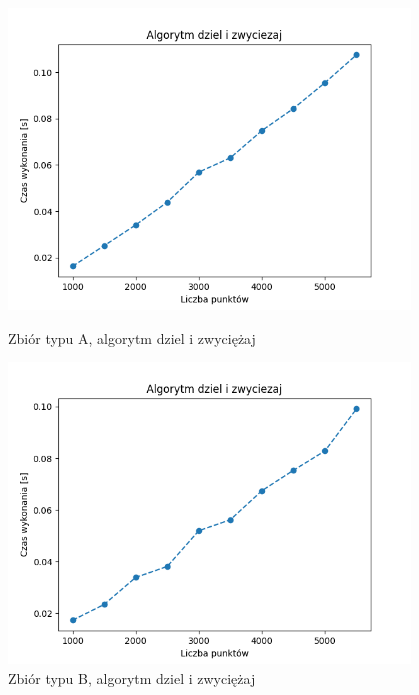 \documentclass[11pt]{article}
\theoremstyle{remark} \newtheorem{definition}{def.}
\theoremstyle{definition} \newtheorem{twierdzenie}{tw.}
\begin{document}
\begin{figure}[]
    \centering
    \begin{minipage}{0.48\textwidth}
        \centering
        \includegraphics[width=0.95\textwidth]{../tests/chmura-dziel.png} %
        \caption{Zbiór typu A, algorytm dziel i zwyciężaj }
        \label{fig:chmura-dziel}
    \end{minipage}\hfill
    \begin{minipage}{0.48\textwidth}
        \centering
        \includegraphics[width=0.95\textwidth]{../tests/okrag-dziel.png} %
        \caption{Zbiór typu B, algorytm dziel i zwyciężaj}
        \label{fig:okrag-dziel}
    \end{minipage}
\end{figure}
\end{document}

